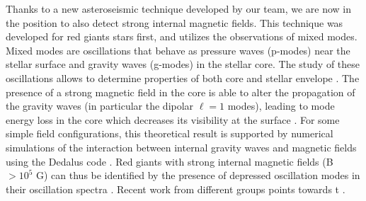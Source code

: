 Thanks to a new asteroseismic technique developed by our team, we are now in the position to also detect strong internal magnetic fields.
This technique was developed for red giants stars first, and utilizes the observations of mixed modes. Mixed modes are
oscillations that behave as pressure waves (p-modes) near the stellar surface and gravity waves (g-modes) in the stellar core.
The study of these oscillations allows to determine properties of both core and stellar envelope \citep[e.g][]{Beck_2011}.
The presence of a strong magnetic field in the core is able to alter the propagation of the gravity waves (in particular the dipolar $\ell =1$ modes),
leading to mode energy loss in the core which decreases its visibility at the surface \citep{Fuller_2015}.
For some simple field configurations, this theoretical result is supported  by numerical simulations of the interaction between
internal gravity waves and magnetic fields using the Dedalus code \citep{Lecoanet_2016}.
Red giants with strong internal magnetic fields (B $> 10^5$ G) can thus be identified by the presence of depressed oscillation modes in their oscillation spectra \citep{Fuller_2015,Stello_2016}. Recent work from different groups points towards t \citet{Mosser_2017}.

